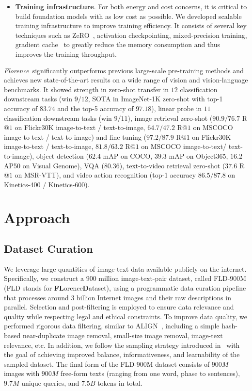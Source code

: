 \documentclass{article}
\newcommand{\Florence}{\emph{Florence~}}
\begin{document}
\begin{itemize}
    \item \textbf{Training infrastructure}. For both energy and cost concerns, it is critical to build foundation models with as low cost as possible. We developed scalable training infrastructure to improve training efficiency. It consists of several key techniques such as ZeRO~\cite{DBLP:journals/corr/abs-1910-02054}, activation checkpointing, mixed-precision training, gradient cache~\cite{gao2021scaling} to greatly reduce the memory consumption and thus improves the training throughput.

\end{itemize}



\Florence significantly outperforms previous large-scale pre-training methods and achieves new state-of-the-art results on a wide range of vision and vision-language benchmarks. It showed strength in zero-shot transfer in $12$ classification downstream tasks (win $9/12$, SOTA in ImageNet-1K zero-shot with top-1 accuracy of {${83.74}$} and the top-5 accuracy of {${97.18}$}), linear probe in $11$ classification downstream tasks (win $9/11$), image retrieval zero-shot ({${90.9}/ {76.7}$} R$@1$ on Flickr30K image-to-text / text-to-image, {${64.7}/ {47.2}$} R$@1$ on MSCOCO image-to-text / text-to-image) and fine-tuning ({${97.2}/ {87.9}$} R$@1$ on Flickr30K image-to-text / text-to-image, {${81.8}/ {63.2}$} R$@ 1$ on MSCOCO image-to-text/ text-to-image), object detection ({${62.4}$} mAP on COCO, {${39.3}$} mAP on Object365, {${16.2}$} AP50 on Visual Genome), VQA ({${80.36}$}), text-to-video retrieval zero-shot ({${37.6}$} R$@1$ on MSR-VTT), and video action recognition (top-1 accuracy {${86.5}/ {87.8}$} on Kinetics-400 / Kinetics-600).


\section{Approach}

\subsection{Dataset Curation}

We leverage large quantities of image-text data available publicly on the internet. Specifically,
we construct a $900$ million image-text-pair dataset, called FLD-900M (FLD stands for {\bf{FL}}orence{\bf{D}}ataset), using a programmatic data curation pipeline that processes around $3$ billion Internet images and their raw descriptions in parallel. Selection and post-filtering is employed to ensure data relevance
and quality while respecting legal and ethical constraints. To improve data quality, we
performed rigorous data filtering, similar to ALIGN~\cite{jia2021scaling}, including a simple
hash-based near-duplicate image removal, small-size image removal, image-text relevance, etc. In addition, we follow the sampling strategy introduced in~\cite{radford2021learning, ramesh2021zeroshot} with the
goal of achieving improved balance, informativeness, and learnability of the sampled dataset. The final form of the FLD-900M dataset consists of $900M$ images with $900M$ free-form texts (ranging from one word, phase to sentences), $9.7M$ unique queries, and $7.5B$ tokens in total.
\end{document}
